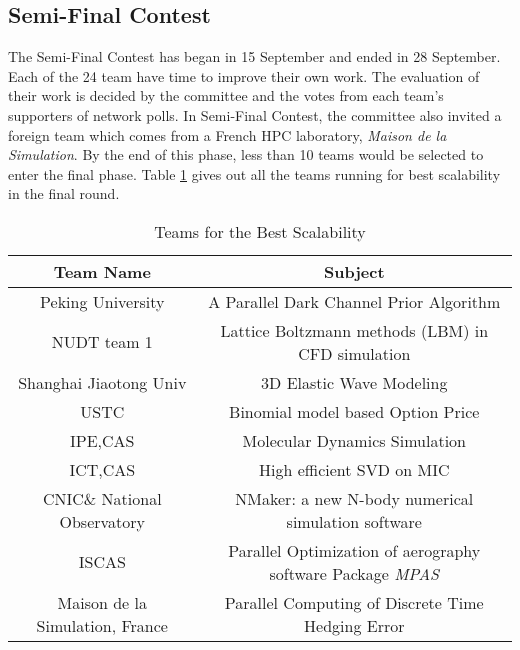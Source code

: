 
\subsection{Semi-Final Contest} %
\label{sub:Semi-Final}
The Semi-Final Contest has began in 15 September and ended in 28 September. Each of the 24 team have time to improve their own work. The evaluation of
their work is decided by the committee and the votes from each team's supporters of network polls. In Semi-Final Contest, the committee also invited 
a foreign team which comes from a French HPC laboratory, \textsl{Maison de la Simulation}. 
By the end of this phase, less than 10 teams would be selected to enter the final phase. 
Table \ref{tab:bestScal} gives out all the teams running for best scalability in the final round. 
\begin{table}[htbp]
\centering
\caption{Teams for the Best Scalability}
\label{tab:bestScal}
\begin{tabular}{|c|c|}
\hline
Team Name & Subject\\
\hline
Peking University & A Parallel Dark Channel Prior Algorithm \\
\hline
NUDT team 1 & Lattice Boltzmann methods (LBM) in CFD simulation \\
\hline
Shanghai Jiaotong Univ & 3D Elastic Wave Modeling \\
\hline
USTC & Binomial model based Option Price \\
\hline
IPE,CAS & Molecular Dynamics Simulation \\
\hline
ICT,CAS & High efficient SVD on MIC \\
\hline
CNIC\& National Observatory & NMaker: a new N-body numerical simulation software \\
\hline
ISCAS & Parallel Optimization of aerography software Package \textsl{MPAS} \\
\hline
Maison de la Simulation, France &  Parallel Computing of Discrete Time Hedging Error\\
\hline
\end{tabular}
\end{table}

